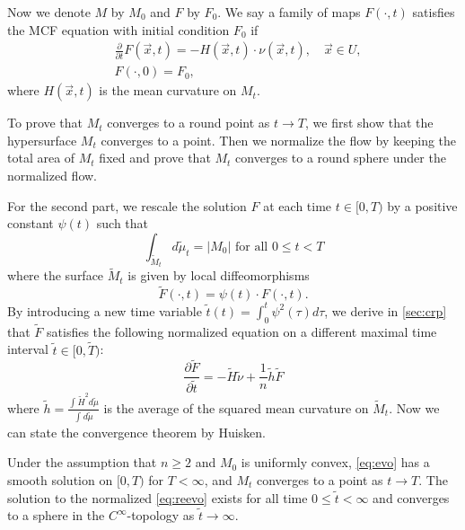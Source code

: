 Now we denote $M$ by $M_0$ and $F$ by $F_0$. We say a family of maps $F(\cdot, t)$ satisfies the MCF equation with initial condition $F_0$ if
 \begin{equation}\label{eq:evo}
 \begin{split}
	& \frac{\partial }{\partial t} F(\vec{x},t)=-H(\vec{x},t) \cdot \nu (\vec{x},t), \quad \vec{x} \in U, \\
	& F(\cdot ,0)=F_0,
 \end{split}
 \end{equation} 
where $H(\vec{x},t)$ is the mean curvature on $M_t$.

To prove that $M_t$ converges to a round point as $t \to T$, we first show that the hypersurface $M_t$ converges to a point. Then we normalize the flow by keeping the total area of $M_t$ fixed and prove that $M_t$ converges to a round sphere under the normalized flow.

For the second part, we rescale the solution $F$ at each time $t \in [0,T)$ by a positive constant $\psi(t)$ such that 
\begin{equation} \label{fixarea}
	\int_{\tilde{M}_t}^{} d \tilde{\mu }_t = \left| M_0 \right| \text{ for all } 0 \leq t < T
\end{equation}
where the surface $\tilde{M}_t$ is given by local diffeomorphisms
\[\tilde{F}(\cdot ,t)=\psi (t) \cdot F(\cdot ,t).\]
By introducing a new time variable $\tilde{t}(t)=\int_{0}^{t}\psi ^2(\tau )d \tau $, we derive in \autoref{sec:crp} that $\tilde{F}$ satisfies the following normalized equation on a different maximal time interval $\tilde{t} \in [0,\tilde{T})$:
\begin{equation} \label{eq:reevo}
	\frac{\partial \tilde{F}}{\partial \tilde{t}}=-\tilde{H}\tilde{\nu }+ \frac{1}{n}\tilde{h}\tilde{F}
\end{equation}
where $\tilde{h}=\frac{\int_{}^{}\tilde{H}^2 d \tilde{\mu} }{\int_{}^{}d \tilde{\mu} }$ is the average of the squared mean curvature on $\tilde{M}_t$.
Now we can state the convergence theorem by Huisken.
\begin{theorem} \label{thm:main1}
	Under the assumption that $n \geq 2$ and $M_0$ is uniformly convex, \autoref{eq:evo} has a smooth solution on $[0,T)$ for $T<\infty $, and $M_t$ converges to a point as $t \to T$. The solution to the normalized \autoref{eq:reevo} exists for all time $0 \leq \tilde{t}< \infty$ and converges to a sphere in the $C^{\infty }$-topology as $\tilde{t} \to \infty $.  
\end{theorem}

